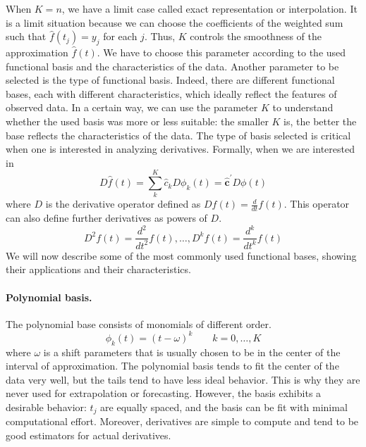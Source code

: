 When $K=n$, we have a limit case called exact representation or interpolation. It is a limit situation because we can choose the coefficients of the weighted sum such that $\hat{f}(t_j)=y_j$ for each $j$. Thus, $K$ controls the smoothness of the approximation $\hat{f}(t)$. We have to choose this parameter according to the used functional basis and the characteristics of the data. Another parameter to be selected is the type of functional basis. Indeed, there are different functional bases, each with different characteristics, which ideally reflect the features of observed data. In a certain way, we can use the parameter $K$ to understand whether the used basis was more or less suitable: the smaller $K$ is, the better the base reflects the characteristics of the data. The type of basis selected is critical when one is interested in analyzing derivatives. Formally, when we are interested in
\begin{equation}
    \label{eq:derivative}
    D \hat{f}(t)=\sum_k^K \hat{c}_k D \phi_k(t)=\hat{\mathbf{c}}^{\prime} D \phi(t)
\end{equation}
where $D$ is the derivative operator defined as $Df(t)=\frac{d}{dt}f(t)$. This operator can also define further derivatives as powers of $D$.
\begin{equation}
    \label{eq:deroperator}
    D^2f(t)=\frac{d^2}{dt^2}f(t), \dots, D^kf(t)=\frac{d^k}{dt^k}f(t)
\end{equation}
We will now describe some of the most commonly used functional bases, showing their applications and their characteristics.
\paragraph{Polynomial basis.} The polynomial base consists of monomials of different order.
\begin{equation}
    \label{eq:polinomial}
    \phi_k(t)=(t-\omega)^k \qquad k=0,\dots, K
\end{equation}
where $\omega$ is a shift parameters that is usually chosen to be in the center of the interval of approximation. The polynomial basis tends to fit the center of the data very well, but the tails tend to have less ideal behavior. This is why they are never used for extrapolation or forecasting. However, the basis exhibits a desirable behavior: $t_j$ are equally spaced, and the basis can be fit with minimal computational effort. Moreover, derivatives are simple to compute and tend to be good estimators for actual derivatives.
